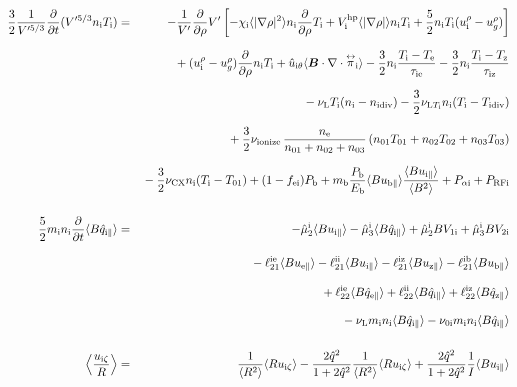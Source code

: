 \documentclass[11pt]{article}
\def\bvec#1{\leavevmode\hbox{\boldmath$#1$}}
\let\vec=\bvec
\def\r#1{{\rm#1}}
\def\ave#1{\left\langle#1\right\rangle}
\def\aves#1{\langle#1\rangle}
\def\tensor#1{\mathord{\displaystyle\mathop{#1}^\leftrightarrow}}
\def\para{\parallel}
\def\ddrho{\frac{\partial}{\partial\rho}}
\def\ddt{\frac{\partial}{\partial t}}
\def\mi{m_\r{i}}
\def\mb{m_\r{b}}
\def\nee{n_\r{e}}
\def\ni{n_\r{i}}
\def\Te{T_\r{e}}
\def\Ti{T_\r{i}}
\def\Tz{T_\r{z}}
\def\uzt#1{u_{\r{#1}\zeta}}
\def\upara#1{u_{\r{#1}\para}}
\def\uhatth#1{\hat{u}_{\r{#1}\theta}}
\def\qhatpara#1{\hat{q}_{\r{#1}\para}}
\def\urho#1{u_\r{#1}^\rho}
\def\ugrho{u_{g}^\rho}
\def\chis#1{\chi_\r{#1}}
\def\nun#1{\nu_\r{0#1}}
\def\ndiv#1{n_\r{#1div}}
\def\Tdiv#1{T_\r{#1div}}
\def\nuLT#1{\nu_{\r{L}T_\r{#1}}}
\def\PRF#1{P_\r{RF#1}}
\def\Palp#1{P_{\alpha\r{#1}}}
\def\fei{f_\r{ei}}
\def\Pb{P_\r{b}}
\def\Eb{E_\r{b}}
\def\nna{n_{01}}
\def\nnb{n_{02}}
\def\nnc{n_{03}}
\def\Tna{T_{01}}
\def\Tnb{T_{02}}
\def\Tnc{T_{03}}
\def\nuL{\nu_\r{L}}
\def\nuCX{\nu_\r{CX}}
\def\nuion{\nu_\r{ionize}}
\begin{document}
\begin{eqnarray}
 \frac{3}{2}\frac{1}{V'^{5/3}} \ddt (V'^{5/3} \ni \Ti ) &=& 
%
  - \frac{1}{V'} \ddrho V'
    \left[ - \chis{i}          \aves{|\nabla\rho|^2} \ni \ddrho \Ti
           + V_\r{i}^\r{hp} \aves{|\nabla\rho|}   \ni \Ti
           + \frac{5}{2} \ni \Ti ( \urho{i} - \ugrho ) \right]
\nonumber\\[2.5mm]&&{}
%
  + ( \urho{i} - \ugrho ) \ddrho \ni \Ti
%
  + \uhatth{i} \aves{\vec{B}\cdot\nabla\cdot\tensor{\pi}_\r{i}}
%
  - \frac{3}{2} \ni \frac{ \Ti - \Te }{\tau_\r{ie}}
  - \frac{3}{2} \ni \frac{ \Ti - \Tz }{\tau_\r{iz}}
\nonumber\\[2.5mm]&&{}
%
  - \nuL \Ti (\ni - \ndiv{i})
%
  - \frac{3}{2} \nuLT{i} \ni (\Ti - \Tdiv{i})
%
\nonumber\\[2.5mm]&&{}
  + \frac{3}{2} \nuion\, \frac{\nee}{\nna + \nnb + \nnc}\, (\nna \Tna +
  \nnb \Tnb + \nnc \Tnc)
\nonumber\\[2.5mm]&&{}
%
  - \frac{3}{2} \nuCX \ni (\Ti - \Tna)
%
  + (1 - \fei) \Pb
%
  + \mb \frac{\Pb}{\Eb} \aves{B \upara{b}} \frac{\aves{B \upara{i}}}{\aves{B^2}}
%
  + \Palp{i}
%
  + \PRF{i}
\\[5mm]
 \frac{5}{2} \mi \ni \ddt \aves{B \qhatpara{i}} &=&
%
  - \hat{\mu}_2^\r{i} \aves{B \upara{i}} 
  - \hat{\mu}_3^\r{i} \aves{B \qhatpara{i}}
%
  + \hat{\mu}_2^\r{i} {B V_{1\r{i}}} 
  + \hat{\mu}_3^\r{i} {B V_{2\r{i}}}
\nonumber\\[3mm]&&{}
%
  - \ell_{21}^{\r{ie}} \aves{B \upara{e}}
  - \ell_{21}^{\r{ii}} \aves{B \upara{i}}
  - \ell_{21}^{\r{iz}} \aves{B \upara{z}}
  - \ell_{21}^{\r{ib}} \aves{B \upara{b}}
\nonumber\\[3mm]&&{}
%
  + \ell_{22}^{\r{ie}} \aves{B \qhatpara{e}}
  + \ell_{22}^{\r{ii}} \aves{B \qhatpara{i}}
  + \ell_{22}^{\r{iz}} \aves{B \qhatpara{z}}
\nonumber\\[3mm]&&{}
%
  - \nuL \mi \ni \aves{B \qhatpara{i}}
%
  - \nun{i} \mi \ni \aves{B \qhatpara{i}}
\\[5mm]
    \ave{\frac{\uzt{i}}{R}} &=&
%
    \frac{1}{\aves{R^2}} \aves{R\uzt{i}}
%
  - \frac{2\hat{q}^2}{1+2\hat{q}^2} \frac{1}{\aves{R^2}}\aves{R\uzt{i}}
%
  + \frac{2\hat{q}^2}{1+2\hat{q}^2} \frac{1}{I} \aves{B\upara{i}}
\end{eqnarray}
%
\end{document}

